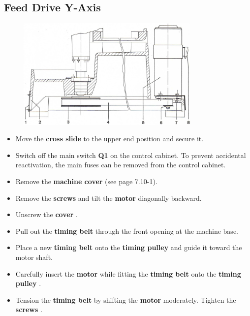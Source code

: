 \newpage
\subsection*{Feed Drive Y-Axis}

\begin{figure}[H]
    \centering
    \includegraphics[width=0.8\textwidth]{images/chapter7/timing_belt_replacement_y_axis.jpg}
    \label{fig:timing_belt_replacement_y_axis}
\end{figure}

\begin{itemize}
    \item Move the \textbf{cross slide} to the upper end position and secure it.
    \item Switch off the main switch \textbf{Q1} on the control cabinet.  
          To prevent accidental reactivation, the main fuses can be removed from the control cabinet.
    \item Remove the \textbf{machine cover } (see page 7.10-1).
    \item Remove the \textbf{screws } and tilt the \textbf{motor } diagonally backward.
    \item Unscrew the \textbf{cover }.
    \item Pull out the \textbf{timing belt } through the front opening \textbf{} at the machine base.
    \item Place a new \textbf{timing belt } onto the \textbf{timing pulley } and guide it toward the motor shaft.
    \item Carefully insert the \textbf{motor } while fitting the \textbf{timing belt } onto the \textbf{timing pulley }.
    \item Tension the \textbf{timing belt} by shifting the \textbf{motor } moderately. Tighten the \textbf{screws }.
\end{itemize}

